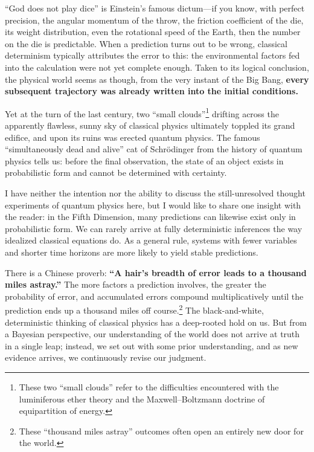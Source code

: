 ``God does not play dice'' is Einstein's famous dictum---if you know, with perfect precision, the angular momentum of the throw, the friction coefficient of the die, its weight distribution, even the rotational speed of the Earth, then the number on the die is predictable.
When a prediction turns out to be wrong, classical determinism typically attributes the error to this: the environmental factors fed into the calculation were not yet complete enough.
Taken to its logical conclusion, the physical world seems as though, from the very instant of the Big Bang, \textbf{every subsequent trajectory was already written into the initial conditions.}
\vspace{1em}

Yet at the turn of the last century, two ``small clouds''\footnote{These two ``small clouds'' refer to the difficulties encountered with the luminiferous ether theory and the Maxwell--Boltzmann doctrine of equipartition of energy.} drifting across the apparently flawless, sunny sky of classical physics ultimately toppled its grand edifice, and upon its ruins was erected quantum physics. The famous ``simultaneously dead and alive'' cat of Schr\"{o}dinger from the history of quantum physics tells us: before the final observation, the state of an object exists in probabilistic form and cannot be determined with certainty.

\vspace{1em}

I have neither the intention nor the ability to discuss the still-unresolved thought experiments of quantum physics here, but I would like to share one insight with the reader: in the Fifth Dimension, many predictions can likewise exist only in probabilistic form. We can rarely arrive at fully deterministic inferences the way idealized classical equations do. As a general rule, systems with fewer variables and shorter time horizons are more likely to yield stable predictions.

\vspace{1em}

There is a Chinese proverb: \textbf{``A hair's breadth of error leads to a thousand miles astray.''} The more factors a prediction involves, the greater the probability of error,
and accumulated errors compound multiplicatively until the prediction ends up a thousand miles off course.\footnote{These ``thousand miles astray'' outcomes often open an entirely new door for the world.}
The black-and-white, deterministic thinking of classical physics has a deep-rooted hold on us. But from a Bayesian perspective, our understanding of the world does not arrive at truth in a single leap; instead, we set out with some prior understanding, and as new evidence arrives, we continuously revise our judgment.

